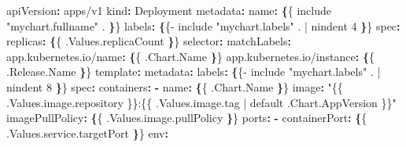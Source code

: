 \documentclass[11pt]{article}
\newenvironment{Shaded}{\begin{snugshade}}{\end{snugshade}}
\newcommand{\AttributeTok}[1]{\textcolor[rgb]{0.16,0.50,0.73}{#1}}
\newcommand{\FunctionTok}[1]{\textcolor[rgb]{0.56,0.27,0.68}{#1}}
\newcommand{\KeywordTok}[1]{\textcolor[rgb]{0.81,0.81,0.76}{\textbf{#1}}}
\newcommand{\StringTok}[1]{\textcolor[rgb]{0.96,0.31,0.31}{#1}}
\begin{document}
\begin{Shaded}
\begin{Highlighting}[]
\FunctionTok{apiVersion}\KeywordTok{:}\AttributeTok{ apps/v1}
\FunctionTok{kind}\KeywordTok{:}\AttributeTok{ Deployment}
\FunctionTok{metadata}\KeywordTok{:}
\AttributeTok{  }\FunctionTok{name}\KeywordTok{:}\AttributeTok{ }\KeywordTok{\{}\AttributeTok{\{ include }\StringTok{"mychart.fullname"}\AttributeTok{ . }\KeywordTok{\}}\AttributeTok{\}}
\AttributeTok{  }\FunctionTok{labels}\KeywordTok{:}
\AttributeTok{    }\KeywordTok{\{}\AttributeTok{\{{-} include }\StringTok{"mychart.labels"}\AttributeTok{ . | nindent 4 }\KeywordTok{\}}\AttributeTok{\}}
\FunctionTok{spec}\KeywordTok{:}
\AttributeTok{  }\FunctionTok{replicas}\KeywordTok{:}\AttributeTok{ }\KeywordTok{\{}\AttributeTok{\{ .Values.replicaCount }\KeywordTok{\}}\AttributeTok{\}}
\AttributeTok{  }\FunctionTok{selector}\KeywordTok{:}
\AttributeTok{    }\FunctionTok{matchLabels}\KeywordTok{:}
\AttributeTok{      }\FunctionTok{app.kubernetes.io/name}\KeywordTok{:}\AttributeTok{ }\KeywordTok{\{}\AttributeTok{\{ .Chart.Name }\KeywordTok{\}}\AttributeTok{\}}
\AttributeTok{      }\FunctionTok{app.kubernetes.io/instance}\KeywordTok{:}\AttributeTok{ }\KeywordTok{\{}\AttributeTok{\{ .Release.Name }\KeywordTok{\}}\AttributeTok{\}}
\AttributeTok{  }\FunctionTok{template}\KeywordTok{:}
\AttributeTok{    }\FunctionTok{metadata}\KeywordTok{:}
\AttributeTok{      }\FunctionTok{labels}\KeywordTok{:}
\AttributeTok{        }\KeywordTok{\{}\AttributeTok{\{{-} include }\StringTok{"mychart.labels"}\AttributeTok{ . | nindent 8 }\KeywordTok{\}}\AttributeTok{\}}
\AttributeTok{    }\FunctionTok{spec}\KeywordTok{:}
\AttributeTok{      }\FunctionTok{containers}\KeywordTok{:}
\AttributeTok{        }\KeywordTok{{-}}\AttributeTok{ }\FunctionTok{name}\KeywordTok{:}\AttributeTok{ }\KeywordTok{\{}\AttributeTok{\{ .Chart.Name }\KeywordTok{\}}\AttributeTok{\}}
\AttributeTok{          }\FunctionTok{image}\KeywordTok{:}\AttributeTok{ }\StringTok{"\{\{ .Values.image.repository \}\}:\{\{ .Values.image.tag | default .Chart.AppVersion \}\}"}
\AttributeTok{          }\FunctionTok{imagePullPolicy}\KeywordTok{:}\AttributeTok{ }\KeywordTok{\{}\AttributeTok{\{ .Values.image.pullPolicy }\KeywordTok{\}}\AttributeTok{\}}
\AttributeTok{          }\FunctionTok{ports}\KeywordTok{:}
\AttributeTok{            }\KeywordTok{{-}}\AttributeTok{ }\FunctionTok{containerPort}\KeywordTok{:}\AttributeTok{ }\KeywordTok{\{}\AttributeTok{\{ .Values.service.targetPort }\KeywordTok{\}}\AttributeTok{\}}
\AttributeTok{          }\FunctionTok{env}\KeywordTok{:}

\end{Highlighting}
\end{Shaded}
\end{document}
